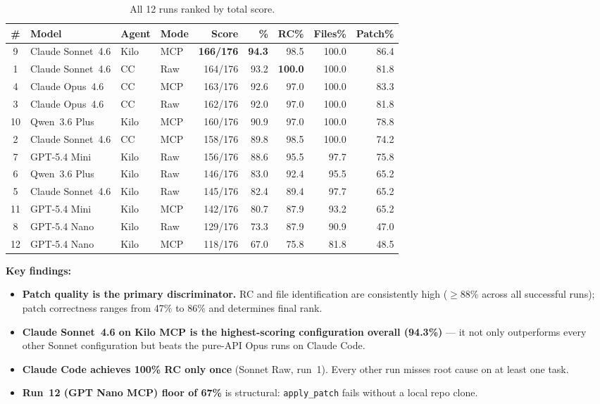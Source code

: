 \begin{table}[h]
\centering
\small
\caption{All 12 runs ranked by total score.}\label{tab:leaderboard}
\setlength{\tabcolsep}{4pt}
\begin{tabular}{clllrrrrr}
\toprule
\textbf{\#} & \textbf{Model} & \textbf{Agent} & \textbf{Mode}
  & \textbf{Score} & \textbf{\%} & \textbf{RC\%} & \textbf{Files\%} & \textbf{Patch\%} \\
\midrule
\rowcolor{bestcol}
 9 & Claude Sonnet~4.6 & Kilo & MCP & \textbf{166/176} & \textbf{94.3} & 98.5 & 100.0 & 86.4 \\
 1 & Claude Sonnet~4.6 & CC   & Raw & 164/176 & 93.2 & \textbf{100.0} & 100.0 & 81.8 \\
 4 & Claude Opus~4.6   & CC   & MCP & 163/176 & 92.6 & 97.0 & 100.0 & 83.3 \\
 3 & Claude Opus~4.6   & CC   & Raw & 162/176 & 92.0 & 97.0 & 100.0 & 81.8 \\
10 & Qwen~3.6 Plus     & Kilo & MCP & 160/176 & 90.9 & 97.0 & 100.0 & 78.8 \\
 2 & Claude Sonnet~4.6 & CC   & MCP & 158/176 & 89.8 & 98.5 & 100.0 & 74.2 \\
 7 & GPT-5.4 Mini      & Kilo & Raw & 156/176 & 88.6 & 95.5 &  97.7 & 75.8 \\
 6 & Qwen~3.6 Plus     & Kilo & Raw & 146/176 & 83.0 & 92.4 &  95.5 & 65.2 \\
 5 & Claude Sonnet~4.6 & Kilo & Raw & 145/176 & 82.4 & 89.4 &  97.7 & 65.2 \\
11 & GPT-5.4 Mini      & Kilo & MCP & 142/176 & 80.7 & 87.9 &  93.2 & 65.2 \\
 8 & GPT-5.4 Nano      & Kilo & Raw & 129/176 & 73.3 & 87.9 &  90.9 & 47.0 \\
12 & GPT-5.4 Nano      & Kilo & MCP & 118/176 & 67.0 & 75.8 &  81.8 & 48.5 \\
\bottomrule
\end{tabular}
\end{table}

\noindent
\textbf{Key findings:}
\begin{itemize}[nosep, leftmargin=*]
  \item \textbf{Patch quality is the primary discriminator.}
        RC and file identification are consistently high ($\ge$88\% across
        all successful runs); patch correctness ranges from 47\% to 86\% and
        determines final rank.
  \item \textbf{Claude Sonnet~4.6 on Kilo MCP is the highest-scoring
        configuration overall (94.3\%)} --- it not only outperforms every
        other Sonnet configuration but beats the pure-API Opus runs on Claude Code.
  \item \textbf{Claude Code achieves 100\% RC only once} (Sonnet Raw, run~1).
        Every other run misses root cause on at least one task.
  \item \textbf{Run~12 (GPT Nano MCP) floor of 67\%} is structural:
        \texttt{apply\_patch} fails without a local repo clone.
\end{itemize}

